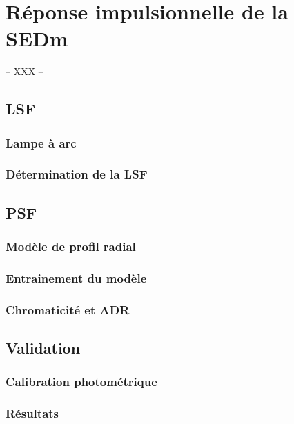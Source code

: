 \documentclass[../main/main.tex]{subfiles}
\begin{document}
\chapter{Réponse impulsionnelle de la SEDm}\label{ch:irf}

-- XXX --

\minitoc
\newpage

\section{LSF}

\subsection{Lampe à arc}

\subsection{Détermination de la LSF}

\section{PSF}

\subsection{Modèle de profil radial}

\subsection{Entrainement du modèle}

\subsection{Chromaticité et ADR}\label{ssec:chromadr}

\section{Validation}

\subsection{Calibration photométrique}

\subsection{Résultats}
\end{document}
